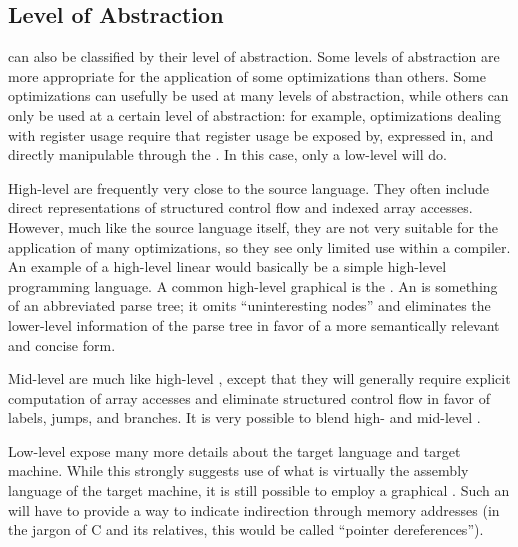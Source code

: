 \subsection{Level of Abstraction}
\IRs can also be classified by their level of abstraction. Some levels of abstraction are more appropriate for the application of some optimizations than others. Some optimizations can usefully be used at many levels of abstraction, while others can only be used at a certain level of abstraction: for example, optimizations dealing with register usage require that register usage be exposed by, expressed in, and directly manipulable through the \IR{}. In this case, only a low-level \IR will do.

High-level \IRs are frequently very close to the source language. They often include direct representations of structured control flow and indexed array accesses. However, much like the source language itself, they are not very suitable for the application of many optimizations, so they see only limited use within a compiler. An example of a high-level linear \IR would basically be a simple high-level programming language. A common high-level graphical \IR is the . An \AST is something of an abbreviated parse tree; it omits ``uninteresting nodes'' and eliminates the lower-level information of the parse tree in favor of a more semantically relevant and concise form.%

Mid-level \IRs are much like high-level \IRs{}, except that they will generally require explicit computation of array accesses and eliminate structured control flow in favor of labels, jumps, and branches. It is very possible to blend high- and mid-level \IRs{}.

Low-level \IRs expose many more details about the target language and target machine. While this strongly suggests use of what is virtually the assembly language of the target machine, it is still possible to employ a graphical \IR{}. Such an \IR will have to provide a way to indicate indirection through memory addresses (in the jargon of C and its relatives, this would be called ``pointer dereferences'').

